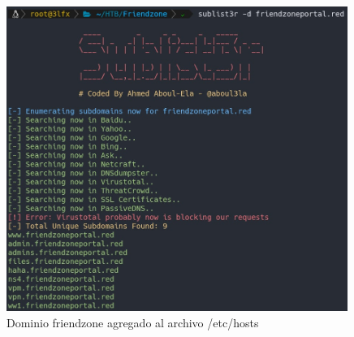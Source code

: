         \begin{figure}[H]
            \centering
            \includegraphics[width=0.99\textwidth]{informe4/imagenes/friendzone/11_sublister1.png}
            \caption{Dominio friendzone agregado al archivo /etc/hosts} 
        \end{figure}

